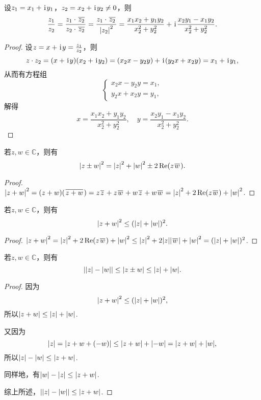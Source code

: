 \begin{theorem}
设\(z_1 = x_1 + \kern1pt\mathrm{i}\kern1pt y_1\)，\(z_2 = x_2 + \kern1pt\mathrm{i}\kern1pt y_2 \neq 0\)，则\[
\frac{z_1}{z_2}
= \frac{z_1 \cdot \kern1pt\overline{z_2}\kern1pt}{z_2 \cdot \kern1pt\overline{z_2}\kern1pt}
= \frac{z_1 \cdot \kern1pt\overline{z_2}\kern1pt}{\abs{z_2}^2}
= \frac{x_1 x_2 + y_1 y_2}{x_2^2 + y_2^2}
+ \kern1pt\mathrm{i}\kern1pt \frac{x_2 y_1 - x_1 y_2}{x_2^2 + y_2^2}.
\]
\begin{proof}
设\(z = x + \kern1pt\mathrm{i}\kern1pt y = \frac{z_1}{z_2}\)，则\[
z \cdot z_2 = (x + \kern1pt\mathrm{i}\kern1pt y)(x_2 + \kern1pt\mathrm{i}\kern1pt y_2)
= (x_2 x - y_2 y) + \kern1pt\mathrm{i}\kern1pt(y_2 x + x_2 y)
= x_1 + \kern1pt\mathrm{i}\kern1pt y_1,
\]从而有方程组\[
\left\{ \begin{array}{l}
x_2 x - y_2 y = x_1, \\
y_2 x + x_2 y = y_1,
\end{array} \right.
\]解得\[
x = \frac{x_1 x_2 + y_1 y_2}{x_2^2 + y_2^2},
\quad
y = \frac{x_2 y_1 - x_1 y_2}{x_2^2 + y_2^2}.
\]
\end{proof}
\end{theorem}

\begin{theorem}
若\(z,w \in \mathbb{C}\)，则有\begin{equation}
\abs{z \pm w}^2 = \abs{z}^2 + \abs{w}^2 \pm 2 \Re(z \kern1pt\overline{w}\kern1pt).
\end{equation}
\begin{proof}
\(
\abs{z + w}^2
= (z + w) (\kern1pt\overline{z + w}\kern1pt)
= z\kern1pt\overline{z}\kern1pt + z\kern1pt\overline{w}\kern1pt + w\kern1pt\overline{z}\kern1pt + w\kern1pt\overline{w}\kern1pt
= \abs{z}^2 + 2 \Re(z\kern1pt\overline{w}\kern1pt) + \abs{w}^2
\).
\end{proof}
\end{theorem}

\begin{theorem}
若\(z,w \in \mathbb{C}\)，则有\begin{equation}
\abs{z + w}^2 \leq (\abs{z} + \abs{w})^2.
\end{equation}
\begin{proof}
\(
\abs{z + w}^2
= \abs{z}^2 + 2 \Re(z \kern1pt\overline{w}\kern1pt) + \abs{w}^2
\leq \abs{z}^2 + 2 \abs{z}\abs{\kern1pt\overline{w}\kern1pt} + \abs{w}^2
= (\abs{z} + \abs{w})^2
\).
\end{proof}
\end{theorem}

\begin{theorem}[三角不等式]
若\(z,w \in \mathbb{C}\)，则有\begin{equation}
\abs{\abs{z}-\abs{w}} \leq \abs{z \pm w} \leq \abs{z} + \abs{w}.
\end{equation}
\begin{proof}
因为\[
\abs{z + w}^2 \leq (\abs{z} + \abs{w})^2,
\]所以\(\abs{z + w} \leq \abs{z} + \abs{w}\).

又因为\[
\abs{z} = \abs{z + w + (-w)} \leq \abs{z+w} + \abs{-w} = \abs{z+w} + \abs{w},
\]所以\(\abs{z}-\abs{w} \leq \abs{z+w}\).

同样地，有\(\abs{w}-\abs{z} \leq \abs{z+w}\).

综上所述，\(\abs{\abs{z}-\abs{w}}\leq\abs{z+w}\).
\end{proof}
\end{theorem}

